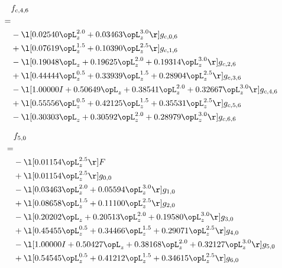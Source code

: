 \begin{alignat}{2} 
\label{eq:f_46_0} 
& f_{c,4,6} \nonumber \\ 
 = \\ 
& - \l[  0.02540 \opL_z^{2.0} +  0.03463 \opL_z^{3.0}  \r] g_{c,0,6} \nonumber \\ 
& + \l[  0.07619 \opL_z^{1.5} +  0.10390 \opL_z^{2.5}  \r] g_{c,1,6} \nonumber \\ 
& - \l[  0.19048 \opL_z +  0.19625 \opL_z^{2.0} +  0.19314 \opL_z^{3.0}  \r] g_{c,2,6} \nonumber \\ 
& + \l[  0.44444 \opL_z^{0.5} +  0.33939 \opL_z^{1.5} +  0.28904 \opL_z^{2.5}  \r] g_{c,3,6} \nonumber \\ 
& - \l[  1.00000 I +  0.50649 \opL_z +  0.38541 \opL_z^{2.0} +  0.32667 \opL_z^{3.0}  \r] g_{c,4,6} \nonumber \\ 
& + \l[  0.55556 \opL_z^{0.5} +  0.42125 \opL_z^{1.5} +  0.35531 \opL_z^{2.5}  \r] g_{c,5,6} \nonumber \\ 
& - \l[  0.30303 \opL_z +  0.30592 \opL_z^{2.0} +  0.28979 \opL_z^{3.0}  \r] g_{c,6,6} \nonumber \\ 
\end{alignat} 


\begin{alignat}{2} 
\label{eq:f_50_0} 
& f_{5,0} \nonumber \\ 
 = \\ 
& - \l[  0.01154 \opL_z^{2.5}  \r] F \nonumber \\ 
& + \l[  0.01154 \opL_z^{2.5}  \r] g_{0,0} \nonumber \\ 
& - \l[  0.03463 \opL_z^{2.0} +  0.05594 \opL_z^{3.0}  \r] g_{1,0} \nonumber \\ 
& + \l[  0.08658 \opL_z^{1.5} +  0.11100 \opL_z^{2.5}  \r] g_{2,0} \nonumber \\ 
& - \l[  0.20202 \opL_z +  0.20513 \opL_z^{2.0} +  0.19580 \opL_z^{3.0}  \r] g_{3,0} \nonumber \\ 
& + \l[  0.45455 \opL_z^{0.5} +  0.34466 \opL_z^{1.5} +  0.29071 \opL_z^{2.5}  \r] g_{4,0} \nonumber \\ 
& - \l[  1.00000 I +  0.50427 \opL_z +  0.38168 \opL_z^{2.0} +  0.32127 \opL_z^{3.0}  \r] g_{5,0} \nonumber \\ 
& + \l[  0.54545 \opL_z^{0.5} +  0.41212 \opL_z^{1.5} +  0.34615 \opL_z^{2.5}  \r] g_{6,0} \nonumber \\ 
\end{alignat} 


